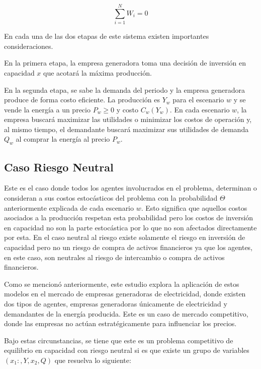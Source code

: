 $$\sum_{i=1}^{N}W_{i} = 0$$

En cada una de las dos etapas de este sistema existen importantes consideraciones.
\vspace{2.5mm}

En la primera etapa, la empresa generadora toma una decisión de inversión en capacidad $x$ que acotará la máxima producción. 
\vspace{2.5mm}

En la segunda etapa, se sabe la demanda del periodo y la empresa generadora produce de forma costo eficiente. La producción es $Y_{w}$ para el escenario $w$ y se vende la energía a un precio $P_{w}\geq 0$ y costo $C_{w}(Y_{w})$. En cada escenario $w$, la empresa buscará maximizar las utilidades o minimizar los costos de operación y, al mismo tiempo, el demandante buscará maximizar sus utilidades de demanda $Q_{w}$ al comprar la energía al precio $P_{w}$.

\subsection{Caso Riesgo Neutral}

Este es el caso donde todos los agentes involucrados en el problema, determinan o consideran a sus costos estocásticos del problema con la probabilidad $\Theta$ anteriormente explicada de cada escenario $w$. Esto significa que aquellos costos asociados a la producción respetan esta probabilidad pero los costos de inversión en capacidad no son la parte estocástica por lo que no son afectados directamente por esta. En el caso neutral al riesgo existe solamente el riesgo en inversión de capacidad pero no un riesgo de compra de activos financieros ya que los agentes, en este caso, son neutrales al riesgo de intercambio o compra de activos financieros. 
\vspace{2.5mm}

Como se mencionó anteriormente, este estudio explora la aplicación de estos modelos en el mercado de empresas generadoras de electricidad, donde existen dos tipos de agentes, empresas generadoras únicamente de electricidad y demandantes de la energía producida. Este es un caso de mercado competitivo, donde las empresas no actúan estratégicamente para influenciar los precios. 
\vspace{2.5mm}

Bajo estas circunstancias, se tiene que este es un problema competitivo de equilibrio en capacidad con riesgo neutral si es que existe un grupo de variables $(x_{1}:, Y, x_{2}, Q)$ que resuelva lo siguiente: 

